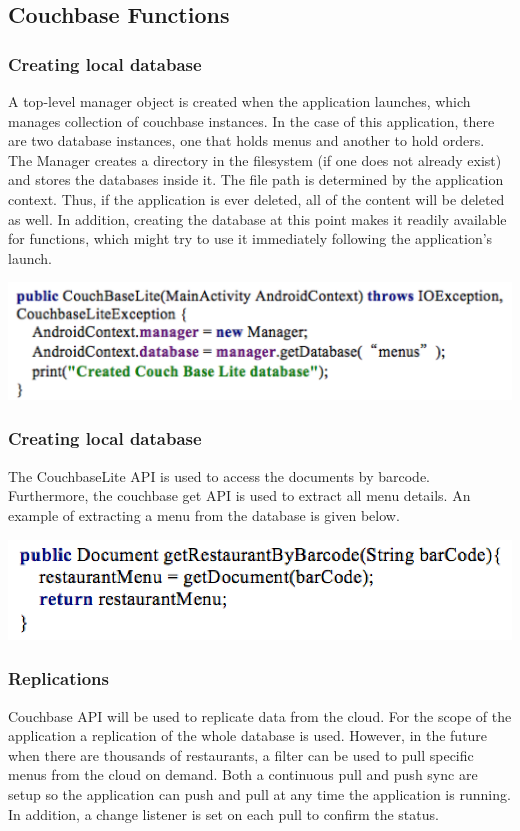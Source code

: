 \documentclass[12pt, titlepage]{article}
\begin{document}
\subsection{Couchbase Functions}

\subsubsection{Creating local database}
A top-level manager object is created when the application launches, which manages collection of couchbase instances. In the case of this application, there are two database instances, one that holds menus and another to hold orders. The Manager creates a directory in the filesystem (if one does not already exist) and stores the databases inside it. The file path is determined by the application context. Thus, if the application is ever deleted, all of the content will be deleted as well. In addition, creating the database at this point makes it readily available for functions, which might try to use it immediately following the application’s launch. 

\includegraphics[width=150mm,scale=0.5]{createDatabase.png}

\subsubsection{Creating local database}
The CouchbaseLite API is used to access the documents by barcode. Furthermore, the couchbase get API is used to extract all menu details. An example of extracting a menu from the database is given below.

\includegraphics[width=150mm,scale=0.5]{accessdatabase.png}

\subsubsection{Replications}
Couchbase API will be used to replicate data from the cloud. For the scope of the application a replication of the whole database is used. However, in the future when there are thousands of restaurants, a filter can be used to pull specific menus from the cloud on demand. Both a continuous pull and push sync are setup so the application can push and pull at any time the application is running. In addition, a change listener is set on each pull to confirm the status. 
\end{document}
